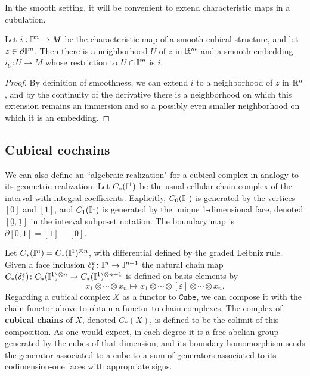 In the smooth setting, it will be convenient to extend characteristic maps in a cubulation.

\begin{lemma}\label{L:charextension}
	Let $i : \mathbb{I}^m \to M$ be the characteristic map of a smooth cubical structure, and let $z \in \partial \mathbb{I}^m$.  Then
	there is a neighborhood $U$ of $z$ in $\mathbb{R}^m$ and a smooth embedding $i_U: U \to M$ whose restriction to $U \cap \mathbb{I}^m$ is $i$.
\end{lemma}

\begin{proof}
	By definition of smoothness, we can extend $i$ to a neighborhood of $z$ in $\mathbb{R}^n$, and by the continuity of the derivative there is a neighborhood on which this extension remains an immersion and so a possibly even smaller neighborhood on which it is an embedding.
\end{proof}


\subsection{Cubical cochains}

We can also define an ``algebraic realization" for a cubical complex in analogy to its geometric realization.
Let $C_{\ast}(\mathbb{I}^1)$ be the usual cellular chain complex of the interval with integral coefficients.
Explicitly, $C_{0}(\mathbb{I}^1)$ is generated by the vertices $[\underline{0}]$ and $[\underline{1}]$, and $C_{1}(\mathbb{I}^1)$ is generated by the unique 1-dimensional face, denoted $[\underline{0},\underline{1}]$ in the interval subposet notation.
The boundary map is $\partial [\underline{0},\underline{1}]=[\underline{1}]-[\underline{0}]$.

Let $C_{\ast}(\mathbb{I}^n) = C_{\ast}(\mathbb{I}^1)^{\otimes n}$, with differential defined by the graded Leibniz rule.
Given a face inclusion $\delta_i^{\varepsilon} \colon \mathbb{I}^n \to \mathbb{I}^{n+1}$ the natural chain map $C_{\ast}(\delta_i^{\varepsilon}) \colon C_{\ast}(\mathbb{I}^1)^{\otimes n} \to C_{\ast}(\mathbb{I}^1)^{\otimes n+1}$ is defined on basis elements by
\begin{equation*}
	x_1 \otimes \cdots \otimes x_n \mapsto
	x_1 \otimes \cdots \otimes [\underline{\varepsilon}] \otimes \cdots \otimes x_n.
\end{equation*}
Regarding a cubical complex $X$ as a functor to $\mathtt{Cube}$, we can compose it with the chain functor above to obtain a functor to chain complexes.
The complex of \textbf{cubical chains} of $X$, denoted $C_*(X)$, is defined to be the colimit of this composition.
As one would expect, in each degree it is a free abelian group generated by the cubes of that dimension, and its boundary homomorphism sends the
generator associated to a cube to a sum of generators associated to its codimension-one faces with appropriate signs.

